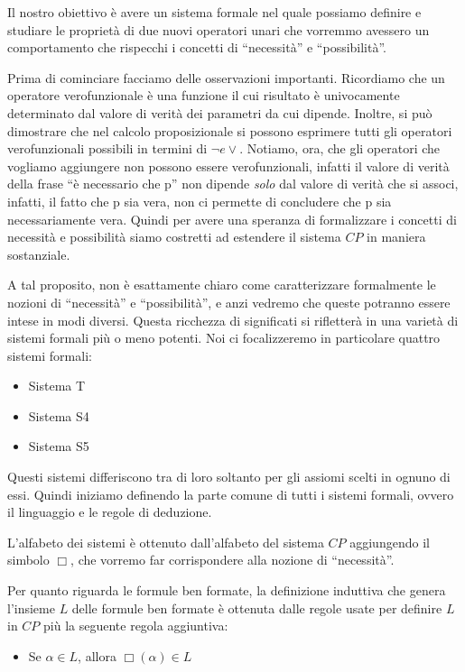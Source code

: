 \documentclass[a4paper, 12pt]{article}
\begin{document}
Il nostro obiettivo è avere un sistema formale nel quale possiamo definire e studiare
le proprietà di due nuovi operatori unari che vorremmo avessero un comportamento che rispecchi
i concetti di ``necessità'' e ``possibilità''.

Prima di cominciare facciamo delle osservazioni importanti.
Ricordiamo che un operatore verofunzionale è una funzione il cui risultato
è univocamente determinato dal valore di verità dei parametri da cui dipende.
Inoltre, si può dimostrare che nel calcolo proposizionale si possono esprimere
tutti gli operatori verofunzionali possibili in termini di $\neg e \vee$.
Notiamo, ora, che gli operatori che vogliamo aggiungere non possono essere verofunzionali,
infatti il valore di verità della frase ``è necessario che p'' non dipende \textit{solo}
dal valore di verità che si associ, infatti, il fatto che p sia vera, non ci permette
di concludere che p sia necessariamente vera. Quindi per avere una speranza di formalizzare
i concetti di necessità e possibilità siamo costretti ad estendere il sistema $CP$
in maniera sostanziale.

A tal proposito, non è esattamente chiaro come caratterizzare formalmente
le nozioni di ``necessità'' e ``possibilità'', e anzi vedremo che queste potranno essere
intese in modi diversi.
Questa ricchezza di significati si rifletterà in una varietà di sistemi formali più o meno potenti.
Noi ci focalizzeremo in particolare quattro sistemi formali:
\begin{itemize}
\item Sistema T
\item Sistema S4
\item Sistema S5
\end{itemize}

Questi sistemi differiscono tra di loro soltanto per gli assiomi scelti in ognuno di essi.
Quindi iniziamo definendo la parte comune di tutti i sistemi formali, ovvero il linguaggio
e le regole di deduzione.

L'alfabeto dei sistemi è ottenuto dall'alfabeto del sistema $CP$ aggiungendo il simbolo $\Box$,
che vorremo far corrispondere alla nozione di ``necessità''.

Per quanto riguarda le formule ben formate, la definizione induttiva che genera l'insieme $L$
delle formule ben formate è ottenuta dalle regole usate per definire $L$ in $CP$ più
la seguente regola aggiuntiva:
\begin{itemize}
\item Se $\alpha \in L$, allora $\Box (\alpha) \in L$
\end{itemize}
\end{document}
